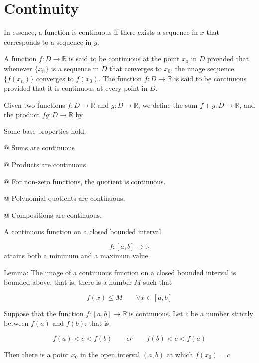 \newpage
\section{Continuity}

In essence, a function is continuous if there exists a sequence in $x$ that corresponds to a sequence in $y$.

\begin{definition}[Continuous]
    A function $f:D \to \mathbb{R}$ is said to be continuous at the point $x_0$ in $D$ provided that whenever $\{x_n\}$
    is a sequence in $D$ that converges to $x_0$, the image sequence $\{f(x_n)\}$ converges to $f(x_0)$. The function
    $f:D \to \mathbb{R}$ is said to be continuous provided that it is continuous at every point in $D$.
\end{definition}

Given two functions $f:D\to\mathbb{R}$ and $g:D\to\mathbb{R}$, we define the sum $f+g:D \to \mathbb{R}$, and the product
$fg:D\to\mathbb{R}$ by

Some base properties hold.

\begin{easylist}[enumerate]
    @ Sums are continuous

    @ Products are continuous

    @ For non-zero functions, the quotient is continuous.

    @ Polynomial quotients are continuous.

    @ Compositions are continuous.
\end{easylist}

\begin{thm}
    A continuous function on a closed bounded interval

    \[
        f:[a, b] \to \mathbb{R}
    \]
    attains both a minimum and a maximum value.

    Lemma: The image of a continuous function on a closed bounded interval is bounded above, that is, there is a number
    $M$ such that

    \[
        f(x) \le M \qquad \forall x \in [a, b]
    \]
\end{thm}

\begin{thm}
    Suppose that the function $f:[a, b]\to\mathbb{R}$ is continuous. Let $c$ be a number strictly between $f(a)$ and
    $f(b)$; that is

    \[
        f(a) < c < f(b) \qquad or \qquad f(b) < c < f(a)
    \]

    Then there is a point $x_0$ in the open interval $(a, b)$ at which $f(x_0) = c$
\end{thm}

